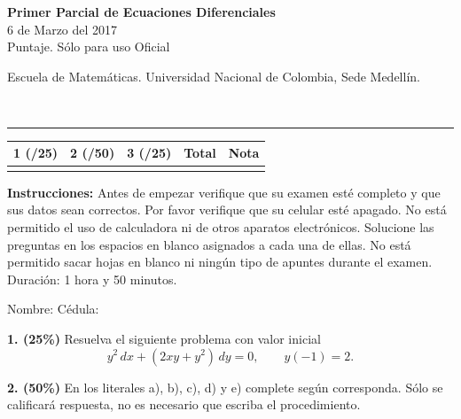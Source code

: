 \documentclass[11pt]{article}
\begin{document}
\noindent
\begin{minipage}[t]{0.62\linewidth}
  {\bfseries\large Primer Parcial de Ecuaciones Diferenciales}\\[2pt]
  {\small 6 de Marzo del 2017}\\
  {\small Puntaje. Sólo para uso Oficial}
\end{minipage}%
\hfill
\begin{minipage}[t]{0.35\linewidth}
  \raggedleft\small Escuela de Matemáticas. Universidad Nacional de Colombia, Sede Medellín.
\end{minipage}\\[4pt]
\rule{\linewidth}{0.6pt}

\vspace{4pt}
\noindent
\begin{tabular}{|c|c|c|c|c|}
\hline
1 (/25) & 2 (/50) & 3 (/25) & Total & Nota \\
\hline
 & & & & \\
\hline
\end{tabular}

\vspace{6pt}
\noindent\textbf{Instrucciones:} Antes de empezar verifique que su examen esté completo y que sus datos sean correctos. Por favor verifique que su celular esté apagado. No está permitido el uso de calculadora ni de otros aparatos electrónicos. Solucione las preguntas en los espacios en blanco asignados a cada una de ellas. No está permitido sacar hojas en blanco ni ningún tipo de apuntes durante el examen. Duración: 1 hora y 50 minutos.

\vspace{8pt}
\noindent Nombre: \makebox[0.45\linewidth]{\hrulefill} \hfill Cédula: \makebox[0.3\linewidth]{\hrulefill}

\vspace{6pt}
\noindent\textbf{1. (25\%)} Resuelva el siguiente problema con valor inicial
\[
y^2\,dx+(2xy+y^2)\,dy=0, \qquad y(-1)=2.
\]

\vspace{7cm}

\newpage

\noindent\textbf{2. (50\%)} En los literales a), b), c), d) y e) complete según corresponda. Sólo se calificará respuesta, no es necesario que escriba el procedimiento.
\end{document}
